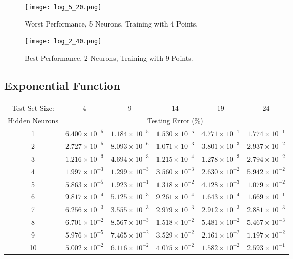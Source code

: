 \documentclass{article}
\begin{document}
		\begin{figure}[!ht]
			\texttt{[image: log\_5\_20.png]}
			\caption{Worst Performance, 5 Neurons, Training with 4 Points.}
			\label{F_L_1}
		\end{figure}
	\pagebreak
		\begin{figure}[!ht]
			\texttt{[image: log\_2\_40.png]}
			\caption{Best Performance, 2 Neurons, Training with 9 Points.}
			\label{F_L_2}
		\end{figure}
	
	\subsection{Exponential Function}
		\begin{minipage}{\linewidth}
			\centering
			\begin{tabular}{c|ccccc}\label{T3}
				Test Set Size:  & 4 & 9 & 14 & 19 & 24 \\
				Hidden Neurons  & \multicolumn{5}{c}{Testing Error (\%)} \\
				\hline\noalign{\smallskip}
				1	& $6.400\times 10^{-5}$	& $1.184\times 10^{-5}$ & $1.530\times 10^{-5}$ & $4.771\times 10^{-1}$ & $1.774\times 10^{-1}$ \\
				2	& $2.727\times 10^{-5}$	& $8.093\times 10^{-6}$ & $1.071\times 10^{-3}$ & $3.801\times 10^{-3}$ & $2.937\times 10^{-2}$ \\
				3	& $1.216\times 10^{-3}$	& $4.694\times 10^{-3}$ & $1.215\times 10^{-4}$ & $1.278\times 10^{-3}$ & $2.794\times 10^{-2}$ \\
				4	& $1.997\times 10^{-3}$	& $1.299\times 10^{-3}$ & $3.560\times 10^{-3}$ & $2.630\times 10^{-2}$ & $5.942\times 10^{-2}$ \\
				5	& $5.863\times 10^{-5}$	& $1.923\times 10^{-1}$ & $1.318\times 10^{-2}$ & $4.128\times 10^{-3}$ & $1.079\times 10^{-2}$ \\
				6	& $9.817\times 10^{-4}$	& $5.125\times 10^{-3}$ & $9.261\times 10^{-4}$ & $1.643\times 10^{-4}$ & $1.669\times 10^{-1}$ \\
				7	& $6.256\times 10^{-3}$	& $3.555\times 10^{-3}$ & $2.979\times 10^{-3}$ & $2.912\times 10^{-3}$ & $2.881\times 10^{-3}$ \\
				8	& $6.701\times 10^{-2}$	& $8.567\times 10^{-3}$ & $1.518\times 10^{-2}$ & $5.481\times 10^{-2}$ & $5.467\times 10^{-3}$ \\
				9	& $5.976\times 10^{-5}$	& $7.465\times 10^{-2}$ & $3.529\times 10^{-2}$ & $2.161\times 10^{-2}$ & $1.197\times 10^{-2}$ \\
				10	& $5.002\times 10^{-2}$	& $6.116\times 10^{-2}$ & $4.075\times 10^{-2}$ & $1.582\times 10^{-2}$ & $2.593\times 10^{-1}$ \\
			\end{tabular}
		\end{minipage}
	
\end{document}
